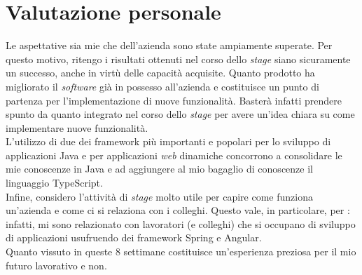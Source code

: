 \section{Valutazione personale}
Le aspettative sia mie che dell'azienda sono state ampiamente superate. Per
questo motivo, ritengo i risultati ottenuti nel corso dello \textit{stage}
siano
sicuramente un successo, anche in virtù delle capacità acquisite. Quanto
prodotto ha migliorato il \textit{software} già in possesso all'azienda
e costituisce un punto di partenza per l'implementazione di nuove funzionalità.
Basterà infatti prendere spunto da quanto integrato nel corso dello
\textit{stage} per avere un'idea chiara su come implementare nuove
funzionalità. \\
L'utilizzo di due dei \gls{framework} più importanti e popolari per lo sviluppo
di applicazioni Java e per applicazioni \textit{web} dinamiche concorrono a
consolidare le mie conoscenze in Java e ad aggiungere al mio bagaglio di
conoscenze il linguaggio TypeScript.  \\
Infine, considero l'attività di \textit{stage} molto utile per capire come
funziona un'azienda e come ci si relaziona con i colleghi. Questo vale, in
particolare, per \myCompany: infatti, mi sono relazionato con lavoratori (e
colleghi) che si occupano di sviluppo di applicazioni usufruendo dei
\gls{framework} Spring e Angular.\\
Quanto vissuto in queste 8 settimane costituisce un'esperienza
preziosa per il mio futuro lavorativo e non.